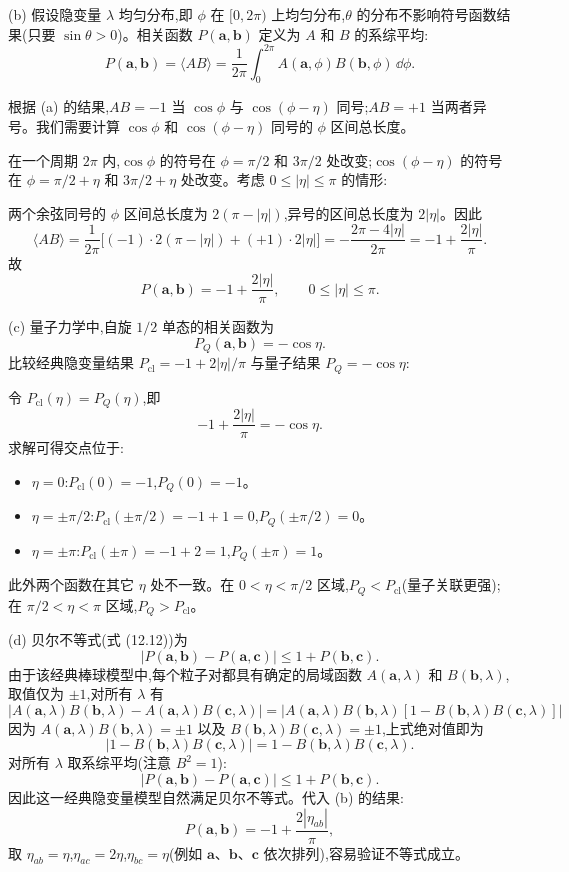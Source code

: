 \begin{question}
\begin{solution}
(b) 假设隐变量 $\lambda$ 均匀分布,即 $\phi$ 在 $[0,2\pi)$ 上均匀分布,$\theta$ 的分布不影响符号函数结果(只要 $\sin\theta>0$)。相关函数 $P(\mathbf a,\mathbf b)$ 定义为 $A$ 和 $B$ 的系综平均:
\[
P(\mathbf a,\mathbf b) = \langle AB\rangle = \frac{1}{2\pi}\int_0^{2\pi} A(\mathbf a,\phi)B(\mathbf b,\phi)\,\dd\phi.
\]

根据 (a) 的结果,$AB = -1$ 当 $\cos\phi$ 与 $\cos(\phi-\eta)$ 同号;$AB = +1$ 当两者异号。我们需要计算 $\cos\phi$ 和 $\cos(\phi-\eta)$ 同号的 $\phi$ 区间总长度。

在一个周期 $2\pi$ 内,$\cos\phi$ 的符号在 $\phi = \pi/2$ 和 $3\pi/2$ 处改变;$\cos(\phi-\eta)$ 的符号在 $\phi = \pi/2+\eta$ 和 $3\pi/2+\eta$ 处改变。考虑 $0\le |\eta|\le\pi$ 的情形:

两个余弦同号的 $\phi$ 区间总长度为 $2(\pi-|\eta|)$,异号的区间总长度为 $2|\eta|$。因此
\[
\langle AB\rangle = \frac{1}{2\pi}\bigl[(-1)\cdot 2(\pi-|\eta|) + (+1)\cdot 2|\eta|\bigr]
= -\frac{2\pi-4|\eta|}{2\pi} = -1 + \frac{2|\eta|}{\pi}.
\]
故
\[
\boxed{P(\mathbf a,\mathbf b) = -1 + \frac{2|\eta|}{\pi},\qquad 0\le|\eta|\le\pi.}
\]

(c) 量子力学中,自旋 $1/2$ 单态的相关函数为
\[
\boxed{P_Q(\mathbf a,\mathbf b) = -\cos\eta.}
\]
比较经典隐变量结果 $P_{\text{cl}} = -1+2|\eta|/\pi$ 与量子结果 $P_Q = -\cos\eta$:

令 $P_{\text{cl}}(\eta)=P_Q(\eta)$,即
\[
-1+\frac{2|\eta|}{\pi} = -\cos\eta.
\]
求解可得交点位于:
\begin{itemize}
\item $\eta=0$:$P_{\text{cl}}(0) = -1$,$P_Q(0) = -1$。
\item $\eta=\pm\pi/2$:$P_{\text{cl}}(\pm\pi/2) = -1+1 = 0$,$P_Q(\pm\pi/2) = 0$。
\item $\eta=\pm\pi$:$P_{\text{cl}}(\pm\pi) = -1+2 = 1$,$P_Q(\pm\pi) = 1$。
\end{itemize}
此外两个函数在其它 $\eta$ 处不一致。在 $0<\eta<\pi/2$ 区域,$P_Q < P_{\text{cl}}$(量子关联更强);在 $\pi/2<\eta<\pi$ 区域,$P_Q > P_{\text{cl}}$。

(d) 贝尔不等式(式 (12.12))为
\[
|P(\mathbf a,\mathbf b)-P(\mathbf a,\mathbf c)| \le 1+P(\mathbf b,\mathbf c).
\]
由于该经典棒球模型中,每个粒子对都具有确定的局域函数 $A(\mathbf a,\lambda)$ 和 $B(\mathbf b,\lambda)$,取值仅为 $\pm1$,对所有 $\lambda$ 有
\[
|A(\mathbf a,\lambda)B(\mathbf b,\lambda)-A(\mathbf a,\lambda)B(\mathbf c,\lambda)| = |A(\mathbf a,\lambda)B(\mathbf b,\lambda)[1-B(\mathbf b,\lambda)B(\mathbf c,\lambda)]|
\]
因为 $A(\mathbf a,\lambda)B(\mathbf b,\lambda)=\pm1$ 以及 $B(\mathbf b,\lambda)B(\mathbf c,\lambda)=\pm1$,上式绝对值即为
\[
|1-B(\mathbf b,\lambda)B(\mathbf c,\lambda)| = 1-B(\mathbf b,\lambda)B(\mathbf c,\lambda).
\]
对所有 $\lambda$ 取系综平均(注意 $B^2=1$):
\[
|P(\mathbf a,\mathbf b)-P(\mathbf a,\mathbf c)| \le 1+P(\mathbf b,\mathbf c).
\]
因此这一经典隐变量模型自然满足贝尔不等式。代入 (b) 的结果:
\[
P(\mathbf a,\mathbf b) = -1+\frac{2|\eta_{ab}|}{\pi},
\]
取 $\eta_{ab}=\eta$,$\eta_{ac}=2\eta$,$\eta_{bc}=\eta$(例如 $\mathbf a$、$\mathbf b$、$\mathbf c$ 依次排列),容易验证不等式成立。
\end{solution}
\end{question}

